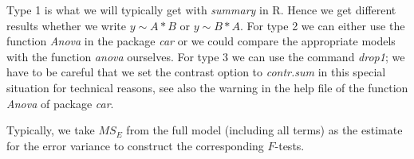 Type 1 is what we will typically get with \textit{summary} in R. Hence we get different results whether we write $y \sim A * B$ or $y \sim B * A$. For type 2 we can either use the function \textit{Anova} in the package \textit{car} or we could compare the appropriate models with the function \textit{anova} ourselves. For type 3 we can use the command \textit{drop1}; we have to be careful that we set the contrast option to \textit{contr.sum} in this special situation for technical reasons, see also the warning in the help file of the function \textit{Anova} of package \textit{car}. \medskip

Typically, we take $MS_E$ from the full model (including all terms) as the estimate for the error variance to construct the corresponding $F$-tests.
